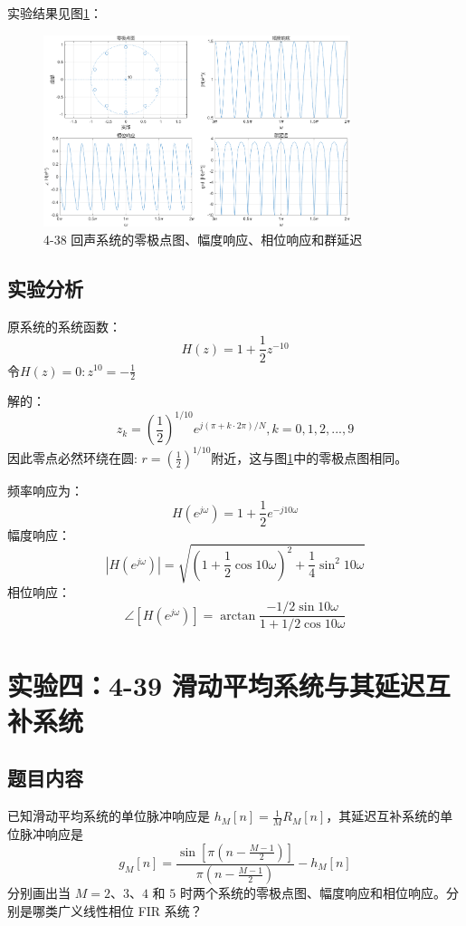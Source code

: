 \documentclass[UTF8,12pt,a4paper]{ctexart}
\begin{document}
实验结果见图\ref{fig:4-38}：

\begin{figure}[htbp]
    \centering
    \includegraphics[width=0.8\textwidth]{4-38 回声系统.png}
    \caption{4-38 回声系统的零极点图、幅度响应、相位响应和群延迟}
    \label{fig:4-38}
\end{figure}

\subsection{实验分析}

原系统的系统函数：
$$H(z)=1+\frac{1}{2}z^{-10}$$
令$H(z)=0: z^{10}=-\frac{1}{2}$

解的：
$$z_k=(\frac{1}{2})^{1/10}e^{j(\pi + k\cdot 2\pi)/N}, k=0,1,2,...,9$$
因此零点必然环绕在圆: $r=(\frac{1}{2})^{1/10}$附近，这与图\ref{fig:4-38}中的零极点图相同。

频率响应为：$$H(e^{j\omega})=1+\frac{1}{2}e^{-j10\omega}$$
幅度响应：$$|H(e^{j\omega})|=\sqrt{(1+\frac{1}{2}\cos{10\omega})^2+\frac{1}{4}\sin^2{10\omega}}$$
相位响应：$$\angle [H(e^{j\omega})] = \arctan \frac{-1/2\sin{10\omega}}{1+1/2\cos{10\omega}}$$

\section{实验四：4-39 滑动平均系统与其延迟互补系统}

\subsection{题目内容}

已知滑动平均系统的单位脉冲响应是 $h_M[n] = \frac{1}{M}R_M[n]$，其延迟互补系统的单位脉冲响应是
$$
g_M[n] = \frac{\sin\left[\pi\left(n - \frac{M-1}{2}\right)\right]}{\pi\left(n - \frac{M-1}{2}\right)} - h_M[n]
$$
分别画出当 $M=2$、$3$、$4$ 和 $5$ 时两个系统的零极点图、幅度响应和相位响应。分别是哪类广义线性相位 FIR 系统？
\end{document}
